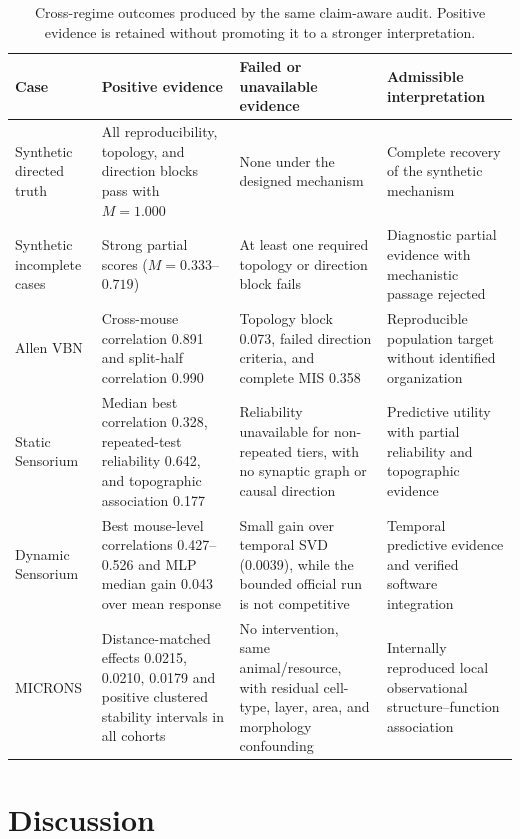 \documentclass[a4paper,fleqn]{cas-sc}
\begin{document}
\begin{table}[t]
\centering
\caption{Cross-regime outcomes produced by the same claim-aware audit. Positive
evidence is retained without promoting it to a stronger interpretation.}
\label{tab:cross-regime-results}
\scriptsize
\begin{tabularx}{\textwidth}{@{}p{2.4cm}p{3.3cm}p{3.3cm}X@{}}
\toprule
Case & Positive evidence & Failed or unavailable evidence & Admissible interpretation \\
\midrule
Synthetic directed truth & All reproducibility, topology, and direction blocks pass with $M=1.000$ & None under the designed mechanism & Complete recovery of the synthetic mechanism \\
Synthetic incomplete cases & Strong partial scores ($M=0.333$--$0.719$) & At least one required topology or direction block fails & Diagnostic partial evidence with mechanistic passage rejected \\
Allen VBN & Cross-mouse correlation 0.891 and split-half correlation 0.990 & Topology block 0.073, failed direction criteria, and complete MIS 0.358 & Reproducible population target without identified organization \\
Static Sensorium & Median best correlation 0.328, repeated-test reliability 0.642, and topographic association 0.177 & Reliability unavailable for non-repeated tiers, with no synaptic graph or causal direction & Predictive utility with partial reliability and topographic evidence \\
Dynamic Sensorium & Best mouse-level correlations 0.427--0.526 and MLP median gain 0.043 over mean response & Small gain over temporal SVD (0.0039), while the bounded official run is not competitive & Temporal predictive evidence and verified software integration \\
MICRONS & Distance-matched effects 0.0215, 0.0210, 0.0179 and positive clustered stability intervals in all cohorts & No intervention, same animal/resource, with residual cell-type, layer, area, and morphology confounding & Internally reproduced local observational structure--function association \\
\bottomrule
\end{tabularx}
\end{table}

\section{Discussion}
\label{sec:discussion}
\end{document}

